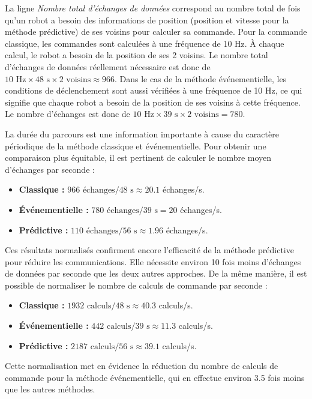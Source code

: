 \vspace{-0.2cm}
La ligne \textit{Nombre total d'échanges de données} correspond au nombre total de fois qu'un robot a besoin des informations de position (position et vitesse pour la méthode prédictive) de ses voisins pour calculer sa commande.
Pour la commande classique, les commandes sont calculées à une fréquence de 10 Hz. À chaque calcul, le robot a besoin de la position de ses 2 voisins. Le nombre total d'échanges de données réellement nécessaire est donc de $10 \text{ Hz} \times 48 \text{ s} \times 2 \text{ voisins} \approx 966$.
Dans le cas de la méthode événementielle, les conditions de déclenchement sont aussi vérifiées à une fréquence de 10 Hz, ce qui signifie que chaque robot a besoin de la position de ses voisins à cette fréquence. Le nombre d'échanges est donc de $10 \text{ Hz} \times 39 \text{ s} \times 2 \text{ voisins} = 780$.

La durée du parcours est une information importante à cause du caractère périodique de la méthode classique et événementielle. Pour obtenir une comparaison plus équitable, il est pertinent de calculer le nombre moyen d'échanges par seconde :
\begin{itemize}
    \item \textbf{Classique :} $966 \text{ échanges} / 48 \text{ s} \approx 20.1$ échanges/s.
    \item \textbf{Événementielle :} $780 \text{ échanges} / 39 \text{ s} = 20$ échanges/s.
    \item \textbf{Prédictive :} $110 \text{ échanges} / 56 \text{ s} \approx 1.96$ échanges/s.
\end{itemize}

Ces résultats normalisés confirment encore l'efficacité de la méthode prédictive pour réduire les communications. Elle nécessite environ 10 fois moins d'échanges de données par seconde que les deux autres approches.
De la même manière, il est possible de normaliser le nombre de calculs de commande par seconde :
\begin{itemize}
    \item \textbf{Classique :} $1932 \text{ calculs} / 48 \text{ s} \approx 40.3$ calculs/s.
    \item \textbf{Événementielle :} $442 \text{ calculs} / 39 \text{ s} \approx 11.3$ calculs/s.
    \item \textbf{Prédictive :} $2187 \text{ calculs} / 56 \text{ s} \approx 39.1$ calculs/s.
\end{itemize}
Cette normalisation met en évidence la réduction du nombre de calculs de commande pour la méthode événementielle, qui en effectue environ 3.5 fois moins que les autres méthodes.

